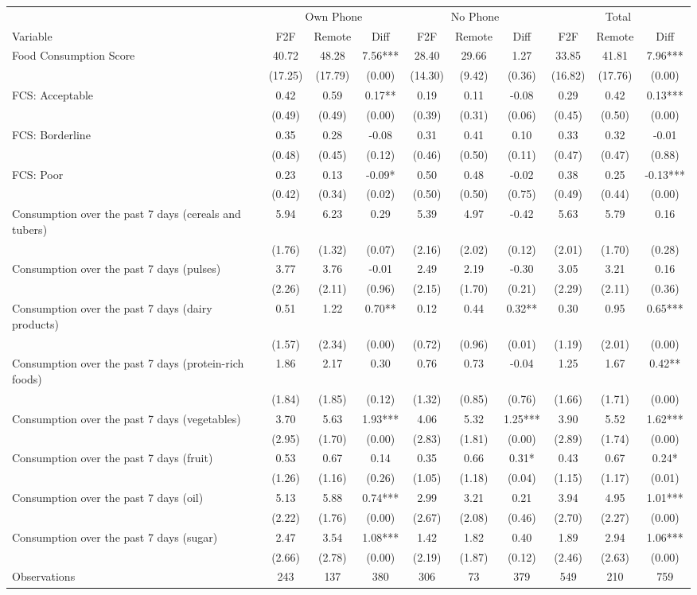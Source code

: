 \begin{tabular}{l*{9}c}
\hline\hline
 & \multicolumn{3}{c}{Own Phone} & \multicolumn{3}{c}{No Phone} & \multicolumn{3}{c}{Total}\\ 
Variable & F2F & Remote & Diff & F2F & Remote & Diff & F2F & Remote & Diff \\
\hline
Food Consumption Score&40.72&48.28&7.56***&28.40&29.66&1.27&33.85&41.81&7.96***\\
&(17.25)&(17.79)&(0.00)&(14.30)&(9.42)&(0.36)&(16.82)&(17.76)&(0.00)\\
FCS: Acceptable&0.42&0.59&0.17**&0.19&0.11&-0.08&0.29&0.42&0.13***\\
&(0.49)&(0.49)&(0.00)&(0.39)&(0.31)&(0.06)&(0.45)&(0.50)&(0.00)\\
FCS: Borderline&0.35&0.28&-0.08&0.31&0.41&0.10&0.33&0.32&-0.01\\
&(0.48)&(0.45)&(0.12)&(0.46)&(0.50)&(0.11)&(0.47)&(0.47)&(0.88)\\
FCS: Poor&0.23&0.13&-0.09*&0.50&0.48&-0.02&0.38&0.25&-0.13***\\
&(0.42)&(0.34)&(0.02)&(0.50)&(0.50)&(0.75)&(0.49)&(0.44)&(0.00)\\
Consumption over the past 7 days (cereals and tubers)&5.94&6.23&0.29&5.39&4.97&-0.42&5.63&5.79&0.16\\
&(1.76)&(1.32)&(0.07)&(2.16)&(2.02)&(0.12)&(2.01)&(1.70)&(0.28)\\
Consumption over the past 7 days (pulses)&3.77&3.76&-0.01&2.49&2.19&-0.30&3.05&3.21&0.16\\
&(2.26)&(2.11)&(0.96)&(2.15)&(1.70)&(0.21)&(2.29)&(2.11)&(0.36)\\
Consumption over the past 7 days (dairy products)&0.51&1.22&0.70**&0.12&0.44&0.32**&0.30&0.95&0.65***\\
&(1.57)&(2.34)&(0.00)&(0.72)&(0.96)&(0.01)&(1.19)&(2.01)&(0.00)\\
Consumption over the past 7 days (protein-rich foods)&1.86&2.17&0.30&0.76&0.73&-0.04&1.25&1.67&0.42**\\
&(1.84)&(1.85)&(0.12)&(1.32)&(0.85)&(0.76)&(1.66)&(1.71)&(0.00)\\
Consumption over the past 7 days (vegetables)&3.70&5.63&1.93***&4.06&5.32&1.25***&3.90&5.52&1.62***\\
&(2.95)&(1.70)&(0.00)&(2.83)&(1.81)&(0.00)&(2.89)&(1.74)&(0.00)\\
Consumption over the past 7 days (fruit)&0.53&0.67&0.14&0.35&0.66&0.31*&0.43&0.67&0.24*\\
&(1.26)&(1.16)&(0.26)&(1.05)&(1.18)&(0.04)&(1.15)&(1.17)&(0.01)\\
Consumption over the past 7 days (oil)&5.13&5.88&0.74***&2.99&3.21&0.21&3.94&4.95&1.01***\\
&(2.22)&(1.76)&(0.00)&(2.67)&(2.08)&(0.46)&(2.70)&(2.27)&(0.00)\\
Consumption over the past 7 days (sugar)&2.47&3.54&1.08***&1.42&1.82&0.40&1.89&2.94&1.06***\\
&(2.66)&(2.78)&(0.00)&(2.19)&(1.87)&(0.12)&(2.46)&(2.63)&(0.00)\\
\hline
Observations & 243 & 137 & 380 & 306 & 73 & 379 & 549 & 210 & 759 \\
\hline\hline
\end{tabular}
